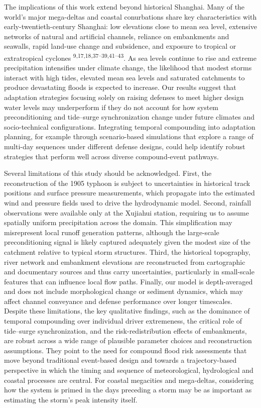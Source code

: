 \documentclass[
]{article}
\begin{document}
The implications of this work extend beyond historical Shanghai. Many of
the world's major mega-deltas and coastal conurbations share key
characteristics with early-twentieth-century Shanghai: low elevations
close to mean sea level, extensive networks of natural and artificial
channels, reliance on embankments and seawalls, rapid land-use change
and subsidence, and exposure to tropical or extratropical cyclones
\textsuperscript{9,17,18,37--39,41--43}. As sea levels continue to rise
and extreme precipitation intensifies under climate change, the
likelihood that modest storms interact with high tides, elevated mean
sea levels and saturated catchments to produce devastating floods is
expected to increase. Our results suggest that adaptation strategies
focusing solely on raising defenses to meet higher design water levels
may underperform if they do not account for how system preconditioning
and tide--surge synchronization change under future climates and
socio-technical configurations. Integrating temporal compounding into
adaptation planning, for example through scenario-based simulations that
explore a range of multi-day sequences under different defense designs,
could help identify robust strategies that perform well across diverse
compound-event pathways.

Several limitations of this study should be acknowledged. First, the
reconstruction of the 1905 typhoon is subject to uncertainties in
historical track positions and surface pressure measurements, which
propagate into the estimated wind and pressure fields used to drive the
hydrodynamic model. Second, rainfall observations were available only at
the Xujiahui station, requiring us to assume spatially uniform
precipitation across the domain. This simplification may misrepresent
local runoff generation patterns, although the large-scale
preconditioning signal is likely captured adequately given the modest
size of the catchment relative to typical storm structures. Third, the
historical topography, river network and embankment elevations are
reconstructed from cartographic and documentary sources and thus carry
uncertainties, particularly in small-scale features that can influence
local flow paths. Finally, our model is depth-averaged and does not
include morphological change or sediment dynamics, which may affect
channel conveyance and defense performance over longer timescales.
Despite these limitations, the key qualitative findings, such as the
dominance of temporal compounding over individual driver extremeness,
the critical role of tide--surge synchronization, and the
risk-redistribution effects of embankments, are robust across a wide
range of plausible parameter choices and reconstruction assumptions.
They point to the need for compound flood risk assessments that move
beyond traditional event-based design and towards a trajectory-based
perspective in which the timing and sequence of meteorological,
hydrological and coastal processes are central. For coastal megacities
and mega-deltas, considering how the system is primed in the days
preceding a storm may be as important as estimating the storm's peak
intensity itself.
\end{document}
